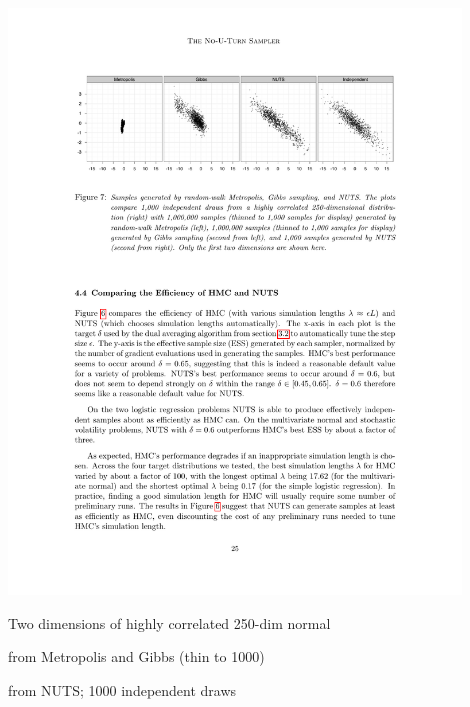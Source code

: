 \documentclass[10pt]{report}
\begin{document}

\includegraphics[width=0.9\textwidth]{img/nuts-vs.pdf}
\begin{subitemize}
\item Two dimensions of highly correlated 250-dim normal
\item {} from Metropolis and Gibbs (thin to 1000)
\item {} from NUTS; 1000 independent draws
\end{subitemize}

\end{document}

